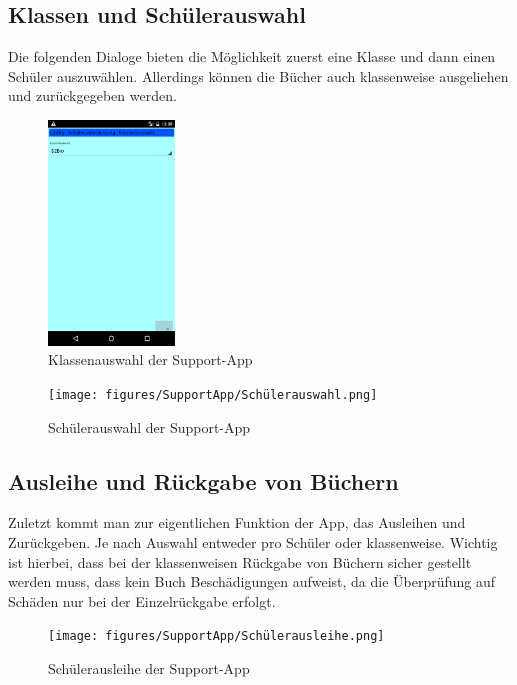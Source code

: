 \subsection{Klassen und Schülerauswahl}
Die folgenden Dialoge bieten die Möglichkeit zuerst eine Klasse und dann einen Schüler auszuwählen. Allerdings können die Bücher auch klassenweise ausgeliehen und zurückgegeben werden.
\begin{figure}[H]
	\centering
		\includegraphics[width=0.30\textwidth]{figures/SupportApp/Klassenauswahl.png}
	\caption{Klassenauswahl der Support-App}
	\label{fig:Klassenauswahl App}
\end{figure}

\begin{figure}[H]
	\centering
		\texttt{[image: figures/SupportApp/Schülerauswahl.png]}
	\caption{Schülerauswahl der Support-App}
	\label{fig:Schülerauswahl App}
\end{figure}

\subsection{Ausleihe und Rückgabe von Büchern}
Zuletzt kommt man zur eigentlichen Funktion der App, das Ausleihen und Zurückgeben. Je nach Auswahl entweder pro Schüler oder klassenweise. Wichtig ist hierbei, dass bei der klassenweisen Rückgabe von Büchern sicher gestellt werden muss, dass kein Buch Beschädigungen aufweist, da die Überprüfung auf Schäden nur bei der Einzelrückgabe erfolgt.
\begin{figure}[H]
	\centering
		\texttt{[image: figures/SupportApp/Schülerausleihe.png]}
	\caption{Schülerausleihe der Support-App}
	\label{fig:Schülerausleihe App}
\end{figure}

